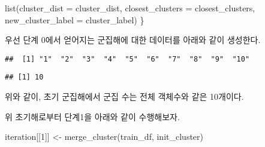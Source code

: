 \documentclass[
]{book}
\newenvironment{Shaded}{\begin{snugshade}}{\end{snugshade}}
\newcommand{\AttributeTok}[1]{\textcolor[rgb]{0.77,0.63,0.00}{#1}}
\newcommand{\DecValTok}[1]{\textcolor[rgb]{0.00,0.00,0.81}{#1}}
\newcommand{\FunctionTok}[1]{\textcolor[rgb]{0.00,0.00,0.00}{#1}}
\newcommand{\NormalTok}[1]{#1}
\newcommand{\OtherTok}[1]{\textcolor[rgb]{0.56,0.35,0.01}{#1}}
\newcommand{\SpecialCharTok}[1]{\textcolor[rgb]{0.00,0.00,0.00}{#1}}
\begin{document}
\begin{Shaded}
\begin{Highlighting}[]
  \FunctionTok{list}\NormalTok{(}\AttributeTok{cluster\_dist =}\NormalTok{ cluster\_dist, }
       \AttributeTok{closest\_clusters =}\NormalTok{ closest\_clusters, }
       \AttributeTok{new\_cluster\_label =}\NormalTok{ cluster\_label)}
\NormalTok{\}}
\end{Highlighting}
\end{Shaded}

우선 단계 0에서 얻어지는 군집해에 대한 데이터를 아래와 같이 생성한다.

\begin{Shaded}
\end{Shaded}

\begin{verbatim}
##  [1] "1"  "2"  "3"  "4"  "5"  "6"  "7"  "8"  "9"  "10"
\end{verbatim}

\begin{Shaded}
\end{Shaded}

\begin{verbatim}
## [1] 10
\end{verbatim}

위와 같이, 초기 군집해에서 군집 수는 전체 객체수와 같은 10개이다.

위 초기해로부터 단계1을 아래와 같이 수행해보자.

\begin{Shaded}
\begin{Highlighting}[]
\NormalTok{iteration[[}\DecValTok{1}\NormalTok{]] }\OtherTok{\textless{}{-}} \FunctionTok{merge\_cluster}\NormalTok{(train\_df, init\_cluster)}
\end{Highlighting}
\end{Shaded}
\end{document}
